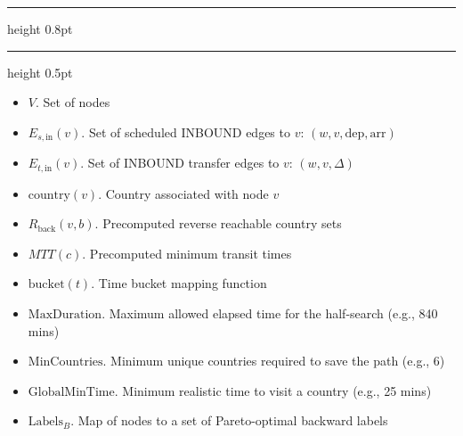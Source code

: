 \documentclass{article}
\begin{document}
\pagestyle{empty}
\allowdisplaybreaks[1] 
\setcounter{page}{1}


\setcounter{algorithm}{10}
\begin{center}
    \hrule height 0.8pt
    \vspace{0.3em}
    \label{alg:bounded_backward_half_search}
    \vspace{0.2em}
    \hrule height 0.5pt
\end{center}

\begin{algorithmic}[1] %
    
    \Input
    \begin{itemize}
        \item $V$. Set of nodes
        \item $E_{s,\text{in}}(v)$. Set of scheduled INBOUND edges to $v$: $(w,v,\text{dep},\text{arr})$
        \item $E_{t,\text{in}}(v)$. Set of INBOUND transfer edges to $v$: $(w,v,\Delta)$
        \item $\text{country}(v)$. Country associated with node $v$
        \item $R_{\text{back}}(v,b)$. Precomputed reverse reachable country sets
        \item $MTT(c)$. Precomputed minimum transit times
        \item $\text{bucket}(t)$. Time bucket mapping function
        \item $\text{MaxDuration}$. Maximum allowed elapsed time for the half-search (e.g., 840 mins)
        \item $\text{MinCountries}$. Minimum unique countries required to save the path (e.g., 6)
        \item $\text{GlobalMinTime}$. Minimum realistic time to visit a country (e.g., 25 mins)
    \end{itemize}

    \Output
    \begin{itemize}
        \item $\text{Labels}_B$. Map of nodes to a set of Pareto-optimal backward labels
    \end{itemize}
    \vspace{0.5em} 


\end{algorithmic}
\end{document}
